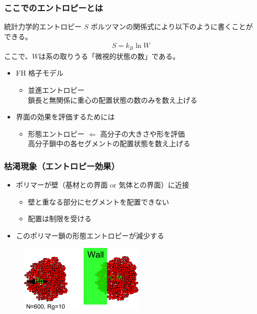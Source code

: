 \documentclass[unicode,12pt]{beamer}%
\begin{document}
\begin{frame}\frametitle{ここでのエントロピーとは}
	\begin{block}{統計力学的エントロピー $S$}
	ボルツマンの関係式により以下のように書くことができる。
	\vspace{-0.5\baselineskip}
	\begin{align*}
	S = k_B \ln W
	\end{align*}
	ここで、$W$は系の取りうる「微視的状態の数」である。
	\end{block}
	\begin{itemize}
	\item FH 格子モデル
		\begin{itemize}
		\item 並進エントロピー\\
		鎖長と無関係に\color{red}重心の配置状態の数のみ\color{black}を数え上げる
		\end{itemize}
	\item 界面の効果を評価するためには
		\begin{itemize}
		\item 形態エントロピー $\Leftarrow$ 高分子の大きさや形を評価\\
		高分子鎖中の\color{red}各セグメントの配置状態\color{black}を数え上げる
		\end{itemize}
	\end{itemize}
\end{frame}
%
\begin{frame}\frametitle{枯渇現象（エントロピー効果）}
	\begin{itemize}
		\item ポリマーが壁（\color{red}基材との界面 or 気体との界面\color{black}）に近接
		\begin{itemize}
			\item 壁と重なる部分にセグメントを配置できない
			\item 配置は\color{red}制限を受ける\color{black}
		\end{itemize}
		\item このポリマー鎖の\color{red}形態エントロピーが減少\color{black}する
	\end{itemize}

	\begin{figure}[htbp]
		\begin{center}
			\includegraphics[width=60mm]{polymer_wall.pdf}
		\end{center}
	\end{figure}

\end{frame}
\end{document}
